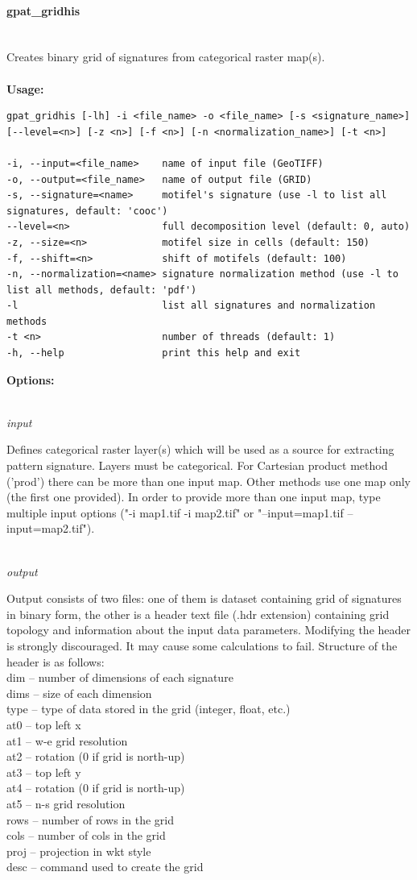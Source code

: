 \documentclass[12pt,margin=0.5in]{article}
\newcommand{\newparagraph}[1]{\paragraph{#1}\mbox{}\\}
\newcommand{\newoption}[1]{\mbox{}\\{\it #1}}
\begin{document}
\newparagraph{gpat\_gridhis}
Creates binary grid of signatures from categorical raster map(s).
\\\\
{\bf Usage:}
\begin{lstlisting}[frame=single]
gpat_gridhis [-lh] -i <file_name> -o <file_name> [-s <signature_name>] [--level=<n>] [-z <n>] [-f <n>] [-n <normalization_name>] [-t <n>]

-i, --input=<file_name>    name of input file (GeoTIFF)
-o, --output=<file_name>   name of output file (GRID)
-s, --signature=<name>     motifel's signature (use -l to list all signatures, default: 'cooc')
--level=<n>                full decomposition level (default: 0, auto)
-z, --size=<n>             motifel size in cells (default: 150)
-f, --shift=<n>            shift of motifels (default: 100)
-n, --normalization=<name> signature normalization method (use -l to list all methods, default: 'pdf')
-l                         list all signatures and normalization methods
-t <n>                     number of threads (default: 1)
-h, --help                 print this help and exit
\end{lstlisting}
{\bf Options:}

\newoption{input}

Defines categorical raster layer(s) which will be used as a source for extracting pattern signature. Layers must be categorical. For Cartesian product method ('prod') there can be more than one input map. Other methods use one map only (the first one provided). In order to provide more than one input map, type multiple input options ("-i map1.tif -i map2.tif" or "--input=map1.tif --input=map2.tif").

\newoption{output}

Output consists of two files: one of them is dataset containing grid of signatures in binary form, the other is a header text file (.hdr extension) containing grid topology and information about the input data parameters. Modifying the header is strongly discouraged. It may cause some calculations to fail. 
Structure of the header is as follows:\\

dim -- number of dimensions of each signature\\
dims -- size of each dimension\\
type -- type of data stored in the grid (integer, float, etc.)\\
at0 -- top left x\\
at1 -- w-e grid resolution\\
at2 -- rotation (0 if grid is north-up)\\
at3 -- top left y\\
at4 -- rotation (0 if grid is north-up)\\
at5 -- n-s grid resolution\\
rows -- number of rows in the grid\\
cols -- number of cols in the grid\\
proj -- projection in wkt style\\
desc -- command used to create the grid
\end{document}
